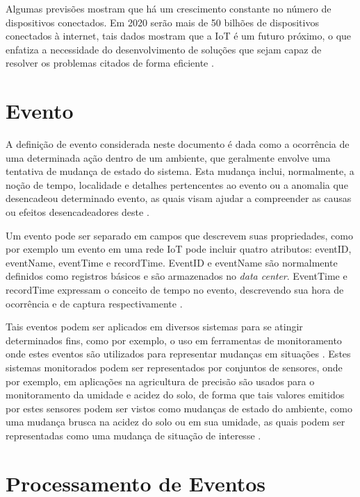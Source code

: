 \documentclass[ti,table]{texufpel} %
\begin{document}
  

  

Algumas previsões mostram que há um crescimento constante no número de dispositivos conectados. Em 2020 serão mais de 50 bilhões de dispositivos conectados à internet, tais dados mostram que a IoT é um futuro próximo, o que enfatiza a necessidade do desenvolvimento de soluções que sejam capaz de resolver os problemas citados de forma eficiente \cite{xavier2016smart}. 

  

\section{Evento} 

A definição de evento considerada neste documento é dada como a ocorrência de uma determinada ação dentro de um ambiente, que geralmente envolve uma tentativa de mudança de estado do sistema. Esta mudança inclui, normalmente, a noção de tempo, localidade e detalhes pertencentes ao evento ou a anomalia que desencadeou determinado evento, as quais visam ajudar a compreender as causas ou efeitos desencadeadores deste \cite{fitzgerald2010common}. 

Um evento pode ser separado em campos que descrevem suas propriedades, como por exemplo um evento em uma rede IoT pode incluir quatro atributos: eventID, eventName, eventTime e recordTime. EventID e eventName são normalmente definidos como registros básicos e são armazenados no \textit{data center}. EventTime e recordTime expressam o conceito de tempo no evento, descrevendo sua hora de ocorrência e de captura respectivamente \cite{minbo2013information}.  

  

Tais eventos podem ser aplicados em diversos sistemas para se atingir determinados fins, como por exemplo, o uso em ferramentas de monitoramento onde estes eventos são utilizados para representar mudanças em situações \cite{etzion2011event}. Estes sistemas monitorados podem ser representados por conjuntos de sensores, onde por exemplo, em aplicações na agricultura de precisão são usados para o monitoramento da umidade e acidez do solo, de forma que tais valores emitidos por estes sensores podem ser vistos como mudanças de estado do ambiente, como uma mudança brusca na acidez do solo ou em sua umidade, as quais podem ser representadas como uma mudança de situação de interesse \cite{garcia2011wireless}. 

  

\section{Processamento de Eventos} 
\end{document}
